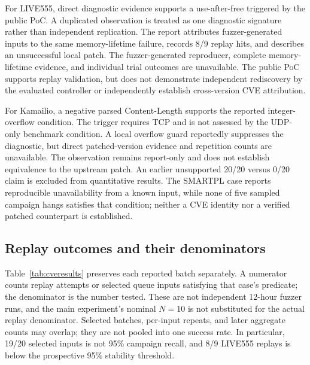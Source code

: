 For LIVE555, direct diagnostic evidence supports a use-after-free triggered by the public PoC. A duplicated observation is treated as one diagnostic signature rather than independent replication. The report attributes fuzzer-generated inputs to the same memory-lifetime failure, records 8/9 replay hits, and describes an unsuccessful local patch. The fuzzer-generated reproducer, complete memory-lifetime evidence, and individual trial outcomes are unavailable. The public PoC supports replay validation, but does not demonstrate independent rediscovery by the evaluated controller or independently establish cross-version CVE attribution.

For Kamailio, a negative parsed Content-Length supports the reported integer-overflow condition. The trigger requires TCP and is not assessed by the UDP-only benchmark condition. A local overflow guard reportedly suppresses the diagnostic, but direct patched-version evidence and repetition counts are unavailable. The observation remains report-only and does not establish equivalence to the upstream patch. An earlier unsupported 20/20 versus 0/20 claim is excluded from quantitative results. The SMARTPL case reports reproducible unavailability from a known input, while none of five sampled campaign hangs satisfies that condition; neither a CVE identity nor a verified patched counterpart is established.

\subsection{Replay outcomes and their denominators}
Table~\ref{tab:cveresults} preserves each reported batch separately. A numerator counts replay attempts or selected queue inputs satisfying that case's predicate; the denominator is the number tested. These are not independent 12-hour fuzzer runs, and the main experiment's nominal $N=10$ is not substituted for the actual replay denominator. Selected batches, per-input repeats, and later aggregate counts may overlap; they are not pooled into one success rate. In particular, 19/20 selected inputs is not 95\% campaign recall, and 8/9 LIVE555 replays is below the prospective 95\% stability threshold.

